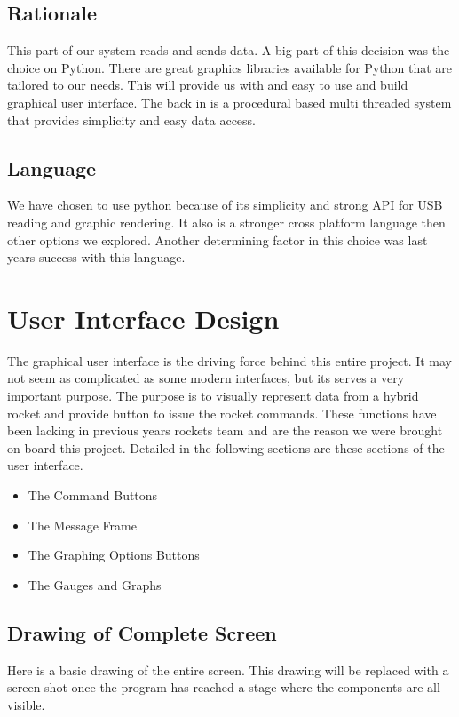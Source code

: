 \documentclass[10pt,draftclsnofoot,onecolumn,compsoc]{IEEEtran}
\begin{document}
\subsection{Rationale}
This part of our system reads and sends data. A big part of this decision was the choice on Python. There are great graphics libraries available for Python that are tailored to our needs. This will provide us with and easy to use and build graphical user interface. The back in is a procedural based multi threaded system that provides simplicity and easy data access.
\subsection{Language}
We have chosen to use python because of its simplicity and strong API for USB reading and graphic rendering. It also is a stronger cross platform language then other options we explored. Another determining factor in this choice was last years success with this language.

\section{User Interface Design}
The graphical user interface is the driving force behind this entire project. It may not seem as complicated as some modern interfaces, but its serves a very important purpose. The purpose is to visually represent data from a hybrid rocket and provide button to issue the rocket commands. These functions have been lacking in previous years rockets team and are the reason we were brought on board this project. Detailed in the following sections are these sections of the user interface. \par

\begin{itemize}
\item The Command Buttons
\item The Message Frame
\item The Graphing Options Buttons
\item The Gauges and  Graphs
\end{itemize}

\subsection{Drawing of Complete Screen}
Here is a basic drawing of the entire screen. This drawing will be replaced with a screen shot once the program has reached a stage where the components are all visible.\par
\end{document}
